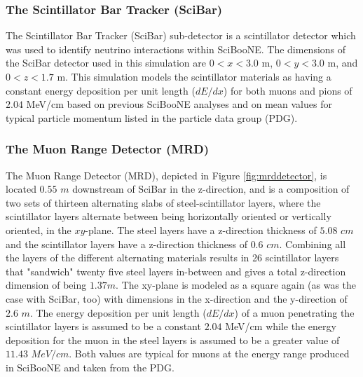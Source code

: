 \documentclass[11pt]{article}
\begin{document}
\subsubsection{The Scintillator Bar Tracker (SciBar)}
\label{subsub:SciBar}
The Scintillator Bar Tracker (SciBar) sub-detector is a scintillator detector which was used to identify neutrino interactions within SciBooNE. The dimensions of the SciBar detector used in this simulation are $0 < x < 3.0$ m, $0 < y < 3.0$ m, and $0 < z < 1.7$ m. This simulation models the scintillator materials as having a constant energy deposition per unit length ($dE/dx$) for both muons and pions of $2.04$ MeV/cm based on previous SciBooNE analyses and on mean values for typical particle momentum listed in the particle data group (PDG).

\subsubsection{The Muon Range Detector (MRD)}
\label{subsub:MRD}
The Muon Range Detector (MRD), depicted in Figure \ref*{fig:mrddetector}, is located $0.55$ $m$ downstream of SciBar in the z-direction, and is a composition of two sets of thirteen alternating slabs of steel-scintillator layers, where the scintillator layers alternate between being horizontally oriented or vertically oriented, in the $xy$-plane. The steel layers have a z-direction thickness of $5.08$ $cm$ and the scintillator layers have a z-direction thickness of $0.6$ $cm$. Combining all the layers of the different alternating materials results in 26 scintillator layers that "sandwich" twenty five steel layers in-between and gives a total z-direction dimension of being $1.37 m$. The xy-plane is modeled as a square again (as was the case with SciBar, too) with dimensions in the x-direction and the y-direction of $2.6$ $m$. The energy deposition per unit length ($dE/dx$) of a muon penetrating the scintillator layers is assumed to be a constant $2.04$ MeV/cm while the energy deposition for the muon in the steel layers is assumed to be a greater value of $11.43$ $MeV/cm$. Both values are typical for muons at the energy range produced in SciBooNE and taken from the PDG.
\end{document}
